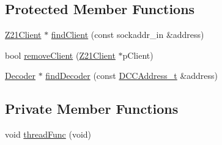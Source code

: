 \subsection*{Protected Member Functions}
\begin{DoxyCompactItemize}
\item 
\hyperlink{classIoTT_1_1Z21Client}{Z21\+Client} $\ast$ \hyperlink{classIoTT_1_1Z21Interface_a51664ae9f82efff951003723efbcd55b}{find\+Client} (const sockaddr\+\_\+in \&address)
\item 
bool \hyperlink{classIoTT_1_1Z21Interface_a16fbab8afaaa86a2c93624238f933631}{remove\+Client} (\hyperlink{classIoTT_1_1Z21Client}{Z21\+Client} $\ast$p\+Client)
\item 
\hyperlink{classIoTT_1_1Decoder}{Decoder} $\ast$ \hyperlink{classIoTT_1_1Z21Interface_a81a8f1e4962c7b47849ec233dd1364af}{find\+Decoder} (const \hyperlink{namespaceIoTT_a31b8cd9473fc447b3fb341b78afa54fe}{D\+C\+C\+Address\+\_\+t} \&address)
\end{DoxyCompactItemize}
\subsection*{Private Member Functions}
\textbf{ }\par
\begin{DoxyCompactItemize}
\item 
void \hyperlink{classIoTT_1_1Z21Interface_a6dd3e3e6c925e4cc09efa1b219936428}{thread\+Func} (void)
\end{DoxyCompactItemize}

